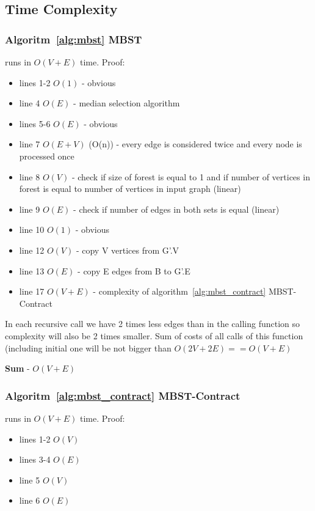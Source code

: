 \documentclass[runningheads, a4paper]{llncs}
\begin{document}
\subsection{Time Complexity}
\subsubsection{Algoritm~\ref{alg:mbst} MBST}
runs in $O(V+E)$ time. Proof:

\begin{itemize}
  \item lines 1-2 $O(1)$ - obvious
  \item line 4 $O(E)$ - median selection algorithm \cite{cormen_9}
  \item lines 5-6 $O(E)$ - obvious
  \item line 7 $O(E+V)$ (O(n)) - every edge is considered twice and every node is processed once
  \item line 8 $O(V)$ - check if size of forest is equal to 1 and if number of vertices in forest is equal to number of vertices in input graph (linear)
  \item line 9 $O(E)$ - check if number of edges  in both sets is equal (linear)
  \item line 10 $O(1)$ - obvious
  \item line 12 $O(V)$ - copy V vertices from G'.V
  \item line 13 $O(E)$ - copy E edges from B to G'.E
  \item line 17 $O(V+E)$ - complexity of algorithm~\ref{alg:mbst_contract} MBST-Contract
\end{itemize}

In each recursive call we have 2 times less edges than in the calling function so complexity will also be 2 times smaller. Sum of costs of all calls of this function (including initial one will be not bigger than $O(2V + 2E) == O(V+E)$

\textbf{Sum} - $O(V + E)$
\subsubsection{Algoritm~\ref{alg:mbst_contract} MBST-Contract}
runs in $O(V+E)$ time. Proof:

\begin{itemize}
    \item lines 1-2 $O(V)$
    \item lines 3-4 $O(E)$
    \item line 5 $O(V)$
    \item line 6 $O(E)$
\end{itemize}
\end{document}
